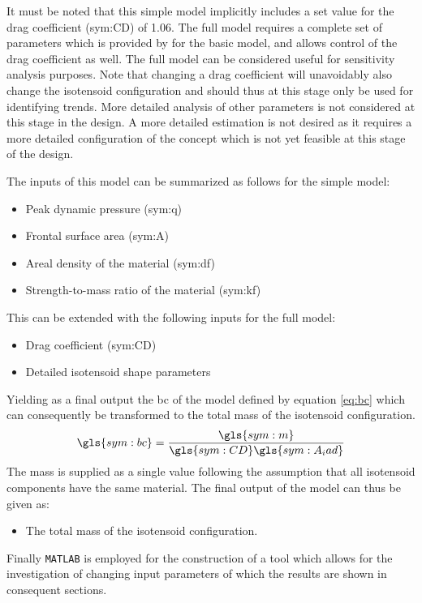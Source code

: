  It must be noted that this simple model implicitly includes a set value for the drag coefficient (\gls{sym:CD}) of 1.06. The full model requires a complete set of parameters which is provided by \cite{Anderson1969} for the basic model, and allows control of the drag coefficient as well. The full model can be considered useful for sensitivity analysis purposes. Note that changing a drag coefficient will unavoidably also change the isotensoid configuration and should thus at this stage only be used for identifying trends.  More detailed analysis of other parameters is not considered at this stage in the design. A more detailed estimation is not desired as it requires a more detailed configuration of the concept which is not yet feasible at this stage of the design.

The inputs of this model can be summarized as follows for the simple model:
\begin{itemize}
\item Peak dynamic pressure (\gls{sym:q})
\item Frontal surface area (\gls{sym:A})
\item Areal density of the material (\gls{sym:df})
\item Strength-to-mass ratio of the material (\gls{sym:kf})
\end{itemize}
This can be extended with the following inputs for the full model:

\begin{itemize}
\item Drag coefficient (\gls{sym:CD})
\item Detailed isotensoid shape parameters
\end{itemize}

Yielding as a final output the \acrfull{bc} of the model defined by equation \ref{eq:bc} which can consequently be transformed to the total mass of the isotensoid configuration. 
\begin{equation}
\gls{sym:bc} = \frac{\gls{sym:m}}{\gls{sym:CD} \gls{sym:A_iad}}
\label{eq:bc}
\end{equation}
The mass is supplied as a single value following the assumption that all isotensoid components have the same material. The final output of the model can thus be given as:
\begin{itemize}
\item The total mass of the isotensoid configuration.
\end{itemize}
Finally \texttt{MATLAB} is employed for the construction of a tool which allows for the investigation of changing input parameters of which the results are shown in consequent sections.


